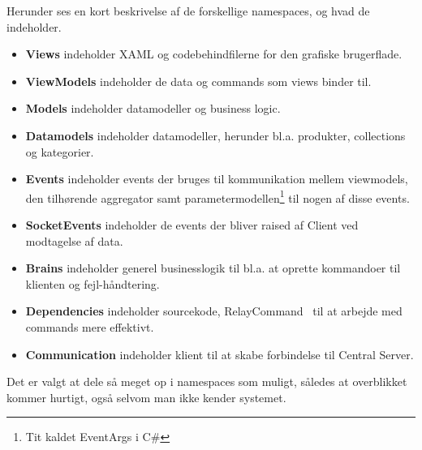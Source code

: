 Herunder ses en kort beskrivelse af de forskellige namespaces, og hvad de indeholder.

\begin{itemize}
\item \textbf{Views} indeholder XAML og codebehindfilerne for den grafiske brugerflade. 
\item \textbf{ViewModels} indeholder de data og commands som views binder til. 
\item \textbf{Models} indeholder datamodeller og business logic.
\item \textbf{Datamodels} indeholder datamodeller, herunder bl.a. produkter, collections og kategorier.
\item \textbf{Events} indeholder events der bruges til kommunikation mellem viewmodels, den tilhørende aggregator samt parametermodellen\footnote{Tit kaldet EventArgs i C\#} til nogen af disse events.
\item \textbf{SocketEvents} indeholder de events der bliver raised af Client ved modtagelse af data.
\item \textbf{Brains} indeholder generel businesslogik til bl.a. at oprette kommandoer til klienten og fejl-håndtering.
\item \textbf{Dependencies} indeholder sourcekode, RelayCommand~\cite{RelayC} til at arbejde med commands mere effektivt.
\item \textbf{Communication} indeholder klient til at skabe forbindelse til Central Server.
\end{itemize}

Det er valgt at dele så meget op i namespaces som muligt, således at overblikket kommer hurtigt, også selvom man ikke kender systemet. 
